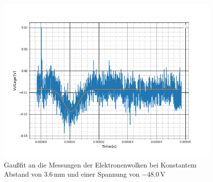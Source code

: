 \begin{figure}
	\includegraphics[scale=0.5]{Bild/A1}
	\centering
	\caption[Gaußfit an Messung bei Konst. Abstand]{Gaußfit an die Messungen der Elektronenwolken bei Konstantem Abstand von $3.6$\,mm und einer Spannung von $-48.0$\,V}
\end{figure}


